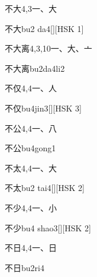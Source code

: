 \begin{entry}{不大}{4,3}{⼀、⼤}
  \begin{phonetics}{不大}{bu2 da4}[][HSK 1]
  \end{phonetics}
\end{entry}

\begin{entry}{不大离}{4,3,10}{⼀、⼤、⼇}
  \begin{phonetics}{不大离}{bu2da4li2}
  \end{phonetics}
\end{entry}

\begin{entry}{不仅}{4,4}{⼀、⼈}
  \begin{phonetics}{不仅}{bu4jin3}[][HSK 3]
  \end{phonetics}
\end{entry}

\begin{entry}{不公}{4,4}{⼀、⼋}
  \begin{phonetics}{不公}{bu4gong1}
  \end{phonetics}
\end{entry}

\begin{entry}{不太}{4,4}{⼀、⼤}
  \begin{phonetics}{不太}{bu2 tai4}[][HSK 2]
  \end{phonetics}
\end{entry}

\begin{entry}{不少}{4,4}{⼀、⼩}
  \begin{phonetics}{不少}{bu4 shao3}[][HSK 2]
  \end{phonetics}
\end{entry}

\begin{entry}{不日}{4,4}{⼀、⽇}
  \begin{phonetics}{不日}{bu2ri4}
  \end{phonetics}
\end{entry}

